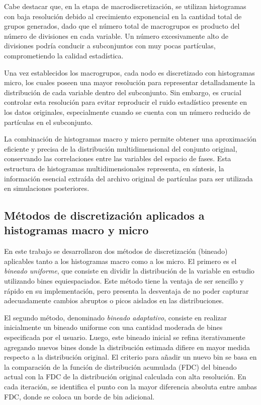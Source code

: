 Cabe destacar que, en la etapa de macrodiscretización, se utilizan histogramas con baja resolución debido al crecimiento exponencial en la cantidad total de grupos generados, dado que el número total de macrogrupos es producto del número de divisiones en cada variable. Un número excesivamente alto de divisiones podría conducir a subconjuntos con muy pocas partículas, comprometiendo la calidad estadística.

Una vez establecidos los macrogrupos, cada nodo es discretizado con histogramas micro, los cuales poseen una mayor resolución para representar detalladamente la distribución de cada variable dentro del subconjunto. Sin embargo, es crucial controlar esta resolución para evitar reproducir el ruido estadístico presente en los datos originales, especialmente cuando se cuenta con un número reducido de partículas en el subconjunto.

La combinación de histogramas macro y micro permite obtener una aproximación eficiente y precisa de la distribución multidimensional del conjunto original, conservando las correlaciones entre las variables del espacio de fases. Esta estructura de histogramas multidimensionales representa, en síntesis, la información esencial extraída del archivo original de partículas para ser utilizada en simulaciones posteriores.

\subsection{Métodos de discretización aplicados a histogramas macro y micro}
En este trabajo se desarrollaron dos métodos de discretización (bineado) aplicables tanto a los histogramas macro como a los micro. El primero es el \textit{bineado uniforme}, que consiste en dividir la distribución de la variable en estudio utilizando bines equiespaciados. Este método tiene la ventaja de ser sencillo y rápido en su implementación, pero presenta la desventaja de no poder capturar adecuadamente cambios abruptos o picos aislados en las distribuciones.

El segundo método, denominado \textit{bineado adaptativo}, consiste en realizar inicialmente un bineado uniforme con una cantidad moderada de bines especificada por el usuario. Luego, este bineado inicial se refina iterativamente agregando nuevos bines donde la distribución estimada difiere en mayor medida respecto a la distribución original. El criterio para añadir un nuevo bin se basa en la comparación de la función de distribución acumulada (FDC) del bineado actual con la FDC de la distribución original calculada con alta resolución. En cada iteración, se identifica el punto con la mayor diferencia absoluta entre ambas FDC, donde se coloca un borde de bin adicional.

